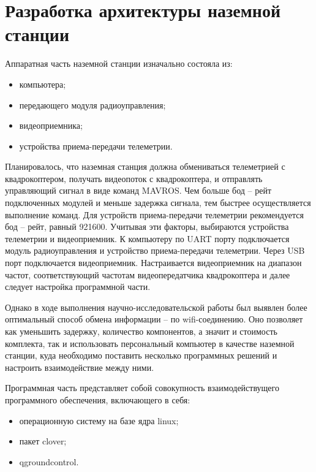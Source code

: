 \section{Разработка архитектуры наземной станции}
Аппаратная часть наземной станции изначально состояла из:
\begin{itemize}
	\item компьютера;
	\item передающего модуля радиоуправления;
	\item видеоприемника;
	\item устройства приема-передачи телеметрии.
\end{itemize}

Планировалось, что наземная станция должна обмениваться телеметрией с квадрокоптером, получать видеопоток с квадрокоптера, и отправлять управляющий сигнал в виде команд MAVROS. Чем больше бод -- рейт подключенных модулей и меньше задержка сигнала, тем быстрее осуществляется выполнение команд. Для устройств приема-передачи телеметрии рекомендуется бод -- рейт, равный 921600. Учитывая эти факторы, выбираются устройства телеметрии и видеоприемник.
К компьютеру по UART порту подключается модуль радиоуправления и устройство приема-передачи телеметрии. Через USB порт подключается видеоприемник. Настраивается видеоприемник на диапазон частот, соответствующий частотам видеопередатчика квадрокоптера и далее следует настройка программной части.

Однако в ходе выполнения научно-исследовательской работы \cite{nir3} был выявлен более оптимальный способ обмена информации -- по wifi-соединению. Оно позволяет как уменьшить задержку, количество компонентов, а значит и стоимость комплекта, так и использовать персональный компьютер в качестве наземной станции, куда необходимо поставить несколько программных решений и настроить взаимодействие между ними.

Программная часть представляет собой совокупность взаимодействущего программного обеспечения, включающего в себя:
\begin{itemize}
	\item операционную систему на базе ядра linux;
	\item пакет clover;
	\item qgroundcontrol.
\end{itemize}

